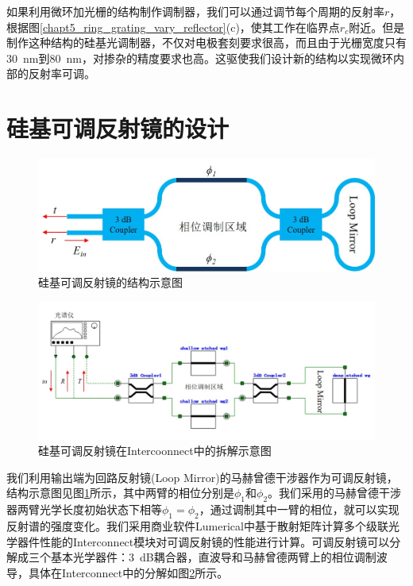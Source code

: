 如果利用微环加光栅的结构制作调制器，我们可以通过调节每个周期的反射率$r$，根据图\ref{chapt5_ring_grating_vary_reflector}(c)，使其工作在临界点$r_c$附近。但是制作这种结构的硅基光调制器，不仅对电极套刻要求很高，而且由于光栅宽度只有30~nm到80~nm，对掺杂的精度要求也高。这驱使我们设计新的结构以实现微环内部的反射率可调。

\section{硅基可调反射镜的设计} \label{tunable_reflector}
\begin{figure}[htb]
	\centering
	\includegraphics[width=12cm]{./Pictures/chapt5_tunable_reflection_mirror.jpg}
	\caption{硅基可调反射镜的结构示意图}
	\label{chapt5_tunable_reflection_mirror}
\end{figure}
\begin{figure}[htb]
	\centering
	\includegraphics[width=15cm]{./Pictures/chapt5_tunable_reflection_mirror_inter.jpg}
	\caption{硅基可调反射镜在Intercoonnect\cite{interconnect}中的拆解示意图}
	\label{chapt5_tunable_reflection_mirror_inter}
\end{figure}
我们利用输出端为回路反射镜(Loop Mirror)的马赫曾德干涉器作为可调反射镜\cite{Li2016design}，结构示意图见图\ref{chapt5_tunable_reflection_mirror}所示，其中两臂的相位分别是$\phi_1$和$\phi_2$。我们采用的马赫曾德干涉器两臂光学长度初始状态下相等$\phi_1 = \phi_2$，通过调制其中一臂的相位，就可以实现反射谱的强度变化。我们采用商业软件Lumerical中基于散射矩阵计算多个级联光学器件性能的Interconnect\cite{interconnect}模块对可调反射镜的性能进行计算。可调反射镜可以分解成三个基本光学器件：3~dB耦合器，直波导和马赫曾德两臂上的相位调制波导，具体在Interconnect中的分解如图\ref{chapt5_tunable_reflection_mirror_inter}所示。
